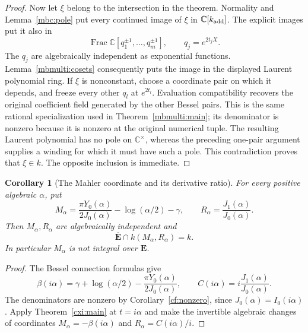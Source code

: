 \documentclass[11pt]{article}
\newtheorem{corollary}[theorem]{Corollary}
\theoremstyle{definition}
\theoremstyle{remark}
\newcommand{\E}{\mathbf E}
\newcommand{\Ebar}{\overline{\mathbf E}}
\begin{document}
\begin{proof}
Now let $\xi$ belong to the intersection in the theorem.  Normality
and Lemma~\ref{mbc:pole} put every continued image of $\xi$ in
$\mathbb C[k_{\rm add}]$.  The explicit images put it also in
\[
 \operatorname{Frac}\mathbb C[q_1^{\pm1},\ldots,q_m^{\pm1}],
 \qquad q_j=e^{2t_jX}.
\]
The $q_j$ are algebraically independent as exponential functions.
Lemma~\ref{mbmulti:cosets} consequently puts the image in the
displayed Laurent polynomial ring.  If $\xi$ is nonconstant, choose
a coordinate pair on which it depends, and freeze every other $q_l$
at $e^{2t_l}$.  Evaluation compatibility recovers the original
coefficient field generated by the other Bessel pairs.  This is the
same rational specialization used in Theorem~\ref{mbmulti:main}; its
denominator is nonzero because it is nonzero at the original numerical
tuple.  The resulting Laurent polynomial has no pole on
$\mathbb C^\times$, whereas the preceding one-pair argument supplies
a winding for which it must have such a pole.  This contradiction
proves that $\xi\in k$.  The opposite inclusion is immediate.
\end{proof}

\begin{corollary}[The Mahler coordinate and its derivative ratio]
\label{cxi:Mahler}
For every positive algebraic $\alpha$, put
\[
 M_\alpha=\frac{\pi Y_0(\alpha)}{2J_0(\alpha)}
              -\log(\alpha/2)-\gamma,
 \qquad R_\alpha=\frac{J_1(\alpha)}{J_0(\alpha)}.
\]
Then $M_\alpha,R_\alpha$ are algebraically independent and
\[
 \Ebar\cap k(M_\alpha,R_\alpha)=k.
\]
In particular $M_\alpha$ is not integral over $\E$.
\end{corollary}
\begin{proof}
The Bessel connection formulas give
\[
 \beta(i\alpha)=\gamma+\log(\alpha/2)
                -\frac{\pi Y_0(\alpha)}{2J_0(\alpha)},\qquad
 C(i\alpha)=i\frac{J_1(\alpha)}{J_0(\alpha)}.
\]
The denominators are nonzero by Corollary~\ref{cf:nonzero}, since
$J_0(\alpha)=I_0(i\alpha)$.  Apply Theorem~\ref{cxi:main} at
$t=i\alpha$ and make the invertible algebraic changes of coordinates
$M_\alpha=-\beta(i\alpha)$ and $R_\alpha=C(i\alpha)/i$.
\end{proof}
\end{document}
